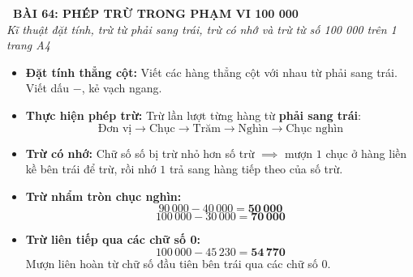 \documentclass[11pt,a4paper]{article}
\begin{document}
\begin{tcolorbox}[
  enhanced,
  colback=white,
  colframe=primary,
  arc=3mm,
  boxrule=1.2pt,
  left=4mm, right=4mm, top=2.5mm, bottom=2.5mm,
  drop shadow=black!10!white
]
  \centering
  {\Large\bfseries\color{primary}\faBookmark\ BÀI 64: PHÉP TRỪ TRONG PHẠM VI 100 000}\\[1.5mm]
  {\small\itshape\color{black!75}Kĩ thuật đặt tính, trừ từ phải sang trái, trừ có nhớ và trừ từ số 100 000 trên 1 trang A4}
\end{tcolorbox}

\vspace{-2mm}


\noindent
\begin{minipage}[t]{0.49\textwidth}\vspace{0pt}
\begin{tcolorbox}[
  enhanced,
  colback=blue!4!white,
  colframe=blue!75!black,
  arc=2mm, boxrule=0.8pt,
  left=2mm, right=2mm, top=1.8mm, bottom=1.8mm,
  title={\footnotesize\bfseries\color{white}\faKey\ 1. Quy trình Đặt tính và Trừ}
]
{\footnotesize
\begin{itemize}\setlength{\itemsep}{1.5pt}\setlength{\leftskip}{-2.5mm}
  \item \textbf{Đặt tính thẳng cột:} Viết các hàng thẳng cột với nhau từ phải sang trái. Viết dấu $-$, kẻ vạch ngang.
  \item \textbf{Thực hiện phép trừ:} Trừ lần lượt từng hàng từ \textbf{phải sang trái}:
  $$\text{Đơn vị} \to \text{Chục} \to \text{Trăm} \to \text{Nghìn} \to \text{Chục nghìn}$$
  \item \textbf{Trừ có nhớ:} Chữ số số bị trừ nhỏ hơn số trừ $\implies$ mượn $1$ chục ở hàng liền kề bên trái để trừ, rồi nhớ $1$ trả sang hàng tiếp theo của số trừ.
\end{itemize}
}
\end{tcolorbox}
\end{minipage}
\hfill
\begin{minipage}[t]{0.49\textwidth}\vspace{0pt}
\begin{tcolorbox}[
  enhanced,
  colback=teal!4!white,
  colframe=teal!75!black,
  arc=2mm, boxrule=0.8pt,
  left=2mm, right=2mm, top=1.8mm, bottom=1.8mm,
  title={\footnotesize\bfseries\color{white}\faCalculator\ 2. Kĩ năng trừ từ số tròn chục nghìn, 100 000}
]
{\footnotesize
\begin{itemize}\setlength{\itemsep}{1.5pt}\setlength{\leftskip}{-2.5mm}
  \item \textbf{Trừ nhẩm tròn chục nghìn:}
  $$90\,000 - 40\,000 = \mathbf{50\,000}$$
  $$100\,000 - 30\,000 = \mathbf{70\,000}$$
  \item \textbf{Trừ liên tiếp qua các chữ số 0:}
  $$100\,000 - 45\,230 = \mathbf{54\,770}$$
  Mượn liên hoàn từ chữ số đầu tiên bên trái qua các chữ số $0$.
\end{itemize}
}
\end{tcolorbox}
\end{minipage}
\end{document}
